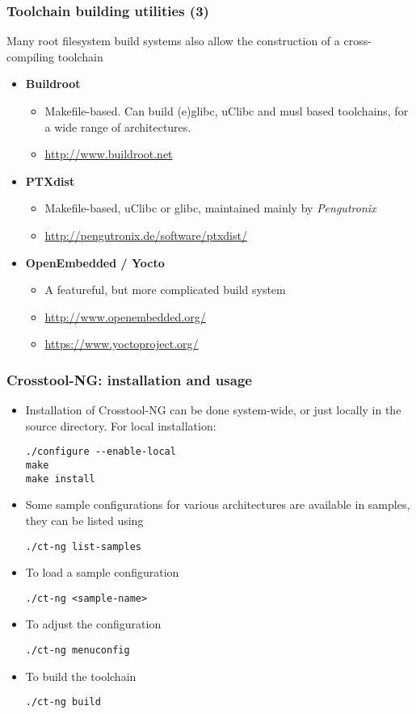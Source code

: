 \begin{frame}
\frametitle{Toolchain building utilities (3)}
Many root filesystem build systems also allow the construction of
a cross-compiling toolchain
\begin{itemize}
\item {\bf Buildroot}
  \begin{itemize}
  \item Makefile-based. Can build (e)glibc, uClibc and musl based
    toolchains, for a wide range of architectures.
  \item \url{http://www.buildroot.net}
  \end{itemize}
\item {\bf PTXdist}
  \begin{itemize}
  \item Makefile-based, uClibc or glibc, maintained mainly by {\em Pengutronix}
  \item \url{http://pengutronix.de/software/ptxdist/}
  \end{itemize}
\item {\bf OpenEmbedded / Yocto}
  \begin{itemize}
  \item A featureful, but more complicated build system
  \item \url{http://www.openembedded.org/}
  \item \url{https://www.yoctoproject.org/}
  \end{itemize}
\end{itemize}
\end{frame}

\begin{frame}[fragile]
  \frametitle{Crosstool-NG: installation and usage}
  \begin{itemize}
  \item Installation of Crosstool-NG can be done system-wide, or just locally in
    the source directory. For local installation:
\begin{verbatim}
./configure --enable-local
make
make install
\end{verbatim}
  \item Some sample configurations for various architectures are
    available in
    samples, they can be listed using
\begin{verbatim}
./ct-ng list-samples
\end{verbatim}
  \item To load a sample configuration
\begin{verbatim}
./ct-ng <sample-name>
\end{verbatim}
  \item To adjust the configuration
\begin{verbatim}
./ct-ng menuconfig
\end{verbatim}
  \item To build the toolchain
\begin{verbatim}
./ct-ng build
\end{verbatim}
  \end{itemize}
\end{frame}

